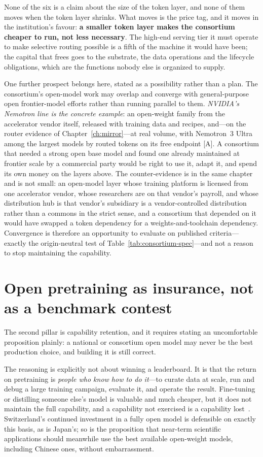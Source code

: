 None of the six is a claim about the size of the token layer, and none of them moves when the token layer shrinks. What moves is the price tag, and it moves in the institution's favour: \textbf{a smaller token layer makes the consortium cheaper to run, not less necessary}. The high-end serving tier it must operate to make selective routing possible is a fifth of the machine it would have been; the capital that frees goes to the substrate, the data operations and the lifecycle obligations, which are the functions nobody else is organized to supply.

One further prospect belongs here, stated as a possibility rather than a plan. The consortium's open-model work may overlap and converge with general-purpose open frontier-model efforts rather than running parallel to them. \emph{NVIDIA's Nemotron line is the concrete example}: an open-weight family from the accelerator vendor itself, released with training data and recipes, and---on the router evidence of Chapter~\ref{ch:mirror}---at real volume, with Nemotron~3 Ultra among the largest models by routed tokens on its free endpoint [A]. A consortium that needed a strong open base model and found one already maintained at frontier scale by a commercial party would be right to use it, adapt it, and spend its own money on the layers above. The counter-evidence is in the same chapter and is not small: an open-model layer whose training platform is licensed from one accelerator vendor, whose researchers are on that vendor's payroll, and whose distribution hub is that vendor's subsidiary is a vendor-controlled distribution rather than a commons in the strict sense, and a consortium that depended on it would have swapped a token dependency for a weights-and-toolchain dependency. Convergence is therefore an opportunity to evaluate on published criteria---exactly the origin-neutral test of Table~\ref{tab:consortium-spec}---and not a reason to stop maintaining the capability.

\section{Open pretraining as insurance, not as a benchmark contest}
\label{sec:pretraining-insurance}

The second pillar is capability retention, and it requires stating an uncomfortable proposition plainly: a national or consortium open model may never be the best production choice, and building it is still correct.

The reasoning is explicitly not about winning a leaderboard. It is that the return on pretraining is \emph{people who know how to do it}---to curate data at scale, run and debug a large training campaign, evaluate it, and operate the result. Fine-tuning or distilling someone else's model is valuable and much cheaper, but it does not maintain the full capability, and a capability not exercised is a capability lost~\cite{consortium-record}. Switzerland's continued investment in a fully open model is defensible on exactly this basis, as is Japan's; so is the proposition that near-term scientific applications should meanwhile use the best available open-weight models, including Chinese ones, without embarrassment.

